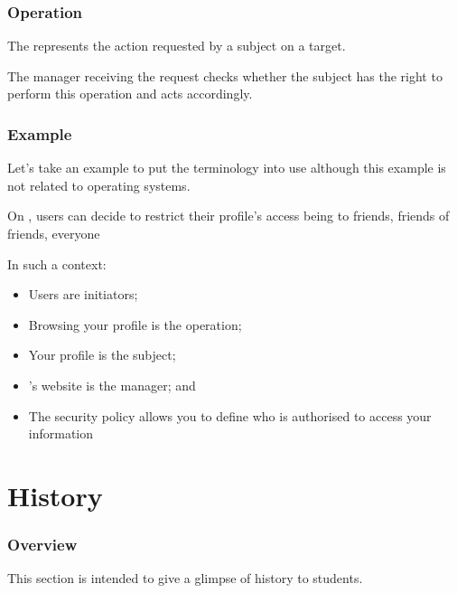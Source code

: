 
\begin{frame}
  \frametitle{Operation}

  The  represents the action requested by a subject on
  a target.

  \-

  The manager receiving the request checks whether the subject has the right
  to perform this operation and acts accordingly.
\end{frame}


\begin{frame}
  \frametitle{Example}

  Let's take an example to put the terminology into use although this
  example is not related to operating systems.

  \-

  On , users can decide to restrict their profile's access
  being to friends, friends of friends, everyone \etc{}

  \-

  In such a context:

  \begin{itemize}
    \item
      Users are initiators;
    \item
      Browsing your profile is the operation;
    \item
      Your profile is the subject;
    \item
      's website is the manager; and
    \item
      The security policy allows you to define who is authorised to access
      your information
  \end{itemize}
\end{frame}

%
%

\section{History}


\begin{frame}
  \frametitle{Overview}

  This section is intended to give a glimpse of history to students.
\end{frame}


